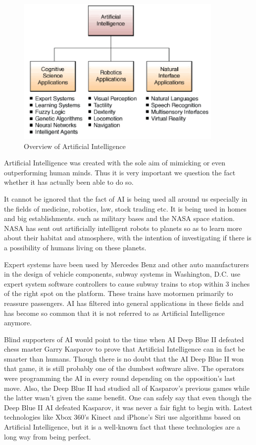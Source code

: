 \begin{figure}[H]
    \centering
    \includegraphics[width=10cm]{images/ai-overview.png}
    \caption{Overview of Artificial Intelligence}
    \label{fig:ai-overview}
\end{figure}

Artificial Intelligence was created with the sole aim of mimicking or even outperforming human minds. Thus it is very important we question the fact whether it has actually been able to do so.

It cannot be ignored that the fact of AI is being used all around us especially in the fields of medicine, robotics, law, stock trading etc. It is being used in homes and big establishments. such as military bases and the NASA space station. NASA has sent out artificially intelligent robots to planets so as to learn more about their habitat and atmosphere, with the intention of investigating if there is a possibility of humans living on these planets.

Expert systems have been used by Mercedes Benz and other auto manufacturers in the design of vehicle components, subway systems in Washington, D.C. use expert system software controllers to cause subway trains to stop within 3 inches of the right spot on the platform. These trains have motormen primarily to reassure passengers. AI has filtered into general applications in these fields and has become so common that it is not referred to as Artificial Intelligence anymore.

Blind supporters of AI would point to the time when AI Deep Blue II defeated chess master Garry Kasparov to prove that Artificial Intelligence can in fact be smarter than humans. Though there is no doubt that the AI Deep Blue II won that game, it is still probably one of the dumbest software alive. The operators were programming the AI in every round depending on the opposition’s last move. Also, the Deep Blue II had studied all of Kasparov’s previous games while the latter wasn’t given the same benefit. One can safely say that even though the Deep Blue II AI defeated Kasparov, it was never a fair fight to begin with. Latest technologies like Xbox 360’s Kinect and iPhone’s Siri use algorithms based on Artificial Intelligence, but it is a well-known fact that these technologies are a long way from being perfect.

